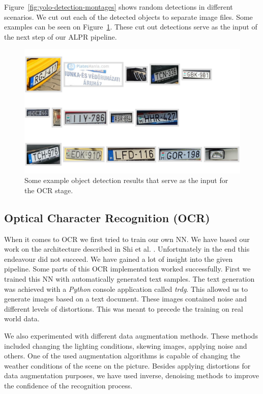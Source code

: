 Figure~\ref{fig:yolo-detection-montages}  shows random detections in different
scenarios. We cut out each of the detected objects to separate image files. Some
examples can be seen on Figure~\ref{fig:cutout-montage}.
These cut out detections serve as the input of the next step of our \ac{ALPR}
pipeline.
\begin{figure}
    \includegraphics[width=\textwidth]{figures/yolo/cutout_montage.jpg}
    \caption{Some example object detection results that serve as the
    input for the OCR stage.}
    \label{fig:cutout-montage}
\end{figure}

\subsection{Optical Character Recognition (OCR)}

When it comes to \ac{OCR} we first tried to train our own \ac{NN}.
We have based our work on the architecture described in Shi et al. \cite{7801919}.
Unfortunately in the end this endeavour did not succeed.
We have gained a lot of insight into the given pipeline.
Some parts of this \ac{OCR} implementation worked successfully.
First we trained this \ac{NN} with automatically generated text samples.
The text generation was achieved with a \emph{Python} console application called \emph{trdg}.
This allowed us to generate images based on a text document.
These images contained noise and different levels of distortions.
This was meant to precede the training on real world data.

We also experimented with different data augmentation methods.
These methods included changing the lighting conditions, skewing images, applying noise and others.
One of the used augmentation algorithms is capable of changing the weather conditions of the scene on the picture.
Besides applying distortions for data augmentation purposes, we have used inverse, denoising methods to improve the confidence of the recognition process.


